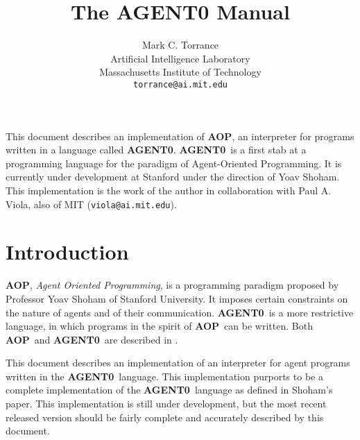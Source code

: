 \relax  %


\textheight 8.25in
\textwidth 6.5in
\topmargin 20pt
\oddsidemargin 0pt
\evensidemargin 0pt

\parskip=0.1in
\parindent=0pt

\newcommand{\ca}{{\tt *current-agent*}}
\newcommand{\aop}{{\bf AOP}}
\newcommand{\ao}{{\bf AGENT0}}

\title{The AGENT0 Manual}
\author{Mark C. Torrance \\ Artificial Intelligence Laboratory \\
	Massachusetts Institute of Technology \\
	{\tt torrance@ai.mit.edu}} 



\maketitle

\begin{center}
\parbox{5in}
{\small This document describes an implementation of \aop, an
interpreter for programs written in a language called \ao.  \ao\ is a
first stab at a programming language for the paradigm of
Agent-Oriented Programming.  It is currently under development at
Stanford under the direction of Yoav Shoham.  This implementation is
the work of the author in collaboration with Paul A. Viola, also of
MIT ({\tt viola@ai.mit.edu}).}
\end{center}

\section{Introduction}

\aop , {\em Agent Oriented Programming\/}, is a programming paradigm
proposed by Professor Yoav Shoham of Stanford University.  It imposes
certain constraints on the nature of agents and of their
communication.  \ao\ is a more restrictive language, in which programs
in the spirit of \aop\ can be written.  Both \aop\ and \ao\ are
described in \cite{shoham90}.

This document describes an implementation of an interpreter for agent
programs written in the \ao\ language.  This implementation purports to
be a complete implementation of the \ao\ language as defined in
Shoham's paper.  This implementation is still under development, but
the most recent released version should be fairly complete and
accurately described by this document.


